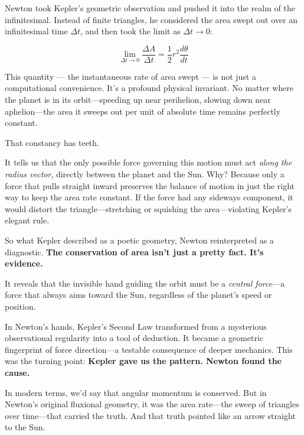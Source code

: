 Newton took Kepler’s geometric observation and pushed it into the realm of the infinitesimal. Instead of finite triangles, he considered the area swept out over an infinitesimal time \( \Delta t \), and then took the limit as \( \Delta t \to 0 \):

\[
\lim_{\Delta t \to 0} \frac{\Delta A}{\Delta t} = \frac{1}{2} r^2 \frac{d\theta}{dt}
\]

This quantity — the instantaneous rate of area swept — is not just a computational convenience. It’s a profound physical invariant. No matter where the planet is in its orbit—speeding up near perihelion, slowing down near aphelion—the area it sweeps out per unit of absolute time remains perfectly constant.

That constancy has teeth.

It tells us that the only possible force governing this motion must act \textit{along the radius vector}, directly between the planet and the Sun. Why? Because only a force that pulls straight inward preserves the balance of motion in just the right way to keep the area rate constant. If the force had any sideways component, it would distort the triangle—stretching or squishing the area—violating Kepler’s elegant rule.

So what Kepler described as a poetic geometry, Newton reinterpreted as a diagnostic.
\textbf{The conservation of area isn’t just a pretty fact. It’s evidence.}

It reveals that the invisible hand guiding the orbit must be a \textit{central force}—a force that always aims toward the Sun, regardless of the planet’s speed or position.

In Newton’s hands, Kepler’s Second Law transformed from a mysterious observational regularity into a tool of deduction. It became a geometric fingerprint of force direction—a testable consequence of deeper mechanics.
This was the turning point:
\textbf{Kepler gave us the pattern. Newton found the cause.}

In modern terms, we’d say that angular momentum is conserved. But in Newton’s original fluxional geometry, it was the area rate—the sweep of triangles over time—that carried the truth.
And that truth pointed like an arrow straight to the Sun.

